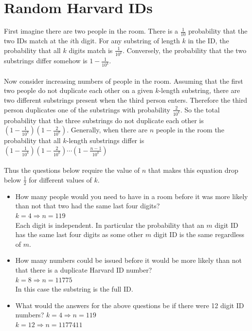 \documentclass[11pt]{article}
\title{}
\author{}
\date{}                                           %
\begin{document}
\maketitle

\section{Random Harvard IDs}
First imagine there are two people in the room. There is a $\frac{1}{10}$ probability that the two IDs match at the $i$th digit. For any substring of length $k$ in the ID, the probability that all $k$ digits match is $\frac{1}{10^{k}}$. Conversely, the probability that the two substrings differ somehow is $1 - \frac{1}{10^{k}}$. \\
\\
Now consider increasing numbers of people in the room. Assuming that the first two people do not duplicate each other on a given $k$-length substring, there are two different substrings present when the third person enters. Therefore the third person duplicates one of the substrings with probability $\frac{2}{10^{k}}$. So the total probability that the three substrings do not duplicate each other is
$\left ( 1 - \frac{1}{10^{k}} \right )  \left (1 -  \frac{2}{10^{k}} \right )$. Generally, when there are $n$ people in the room the probability that all $k$-length substrings differ is $\left ( 1 - \frac{1}{10^{k}} \right )  \left (1 -  \frac{2}{10^{k}} \right ) \cdots  \left (1 - \frac{n-1}{10^{k}} \right )$
\\
\\
Thus the questions below require the value of $n$ that makes this equation drop below $\frac{1}{2}$ for different values of $k$.
\\
\begin{itemize}
\item How many people would you need to have in a room before it was more likely than not that two had the same last four digits? \\
$k = 4 \Rightarrow n = 119$ \\
Each digit is independent. In particular the probability that an $m$ digit ID has the same last four digits as some other $m$ digit ID is the same regardless of $m$.
\item How many numbers could be issued before it would be more likely than not that there is a duplicate Harvard ID number? \\
$k = 8 \Rightarrow n = 11775$ \\
In this case the substring is the full ID.
\item What would the answers for the above questions be if there were 12 digit ID numbers?
$k = 4 \Rightarrow n = 119$ \\
$k = 12 \Rightarrow n = 1177411$
\end{itemize}
\end{document}
